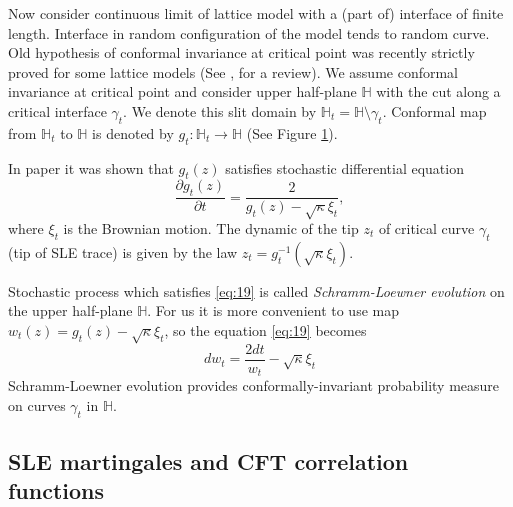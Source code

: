 \documentclass[a4paper]{jpconf}
\theoremstyle{definition}
\theoremstyle{definition} \newtheorem{Def}{Definition}
\begin{document}
Now consider continuous limit of lattice model with a (part of) interface of finite length. Interface in random configuration of the model tends to random curve. Old hypothesis \cite{Polyakov:1970xd} of conformal invariance at critical point was recently strictly proved for some lattice models (See \cite{smirnov2007towards}, \cite{duminil2011conformal} for a review). We assume conformal invariance at critical point and consider upper half-plane $\mathbb{H}$ with the cut along a critical interface $\gamma_{t}$. We denote this slit domain by $\mathbb{H}_{t}=\mathbb{H}\setminus \gamma_{t}$. Conformal map from $\mathbb{H}_{t}$ to $\mathbb{H}$ is denoted by $g_{t}:\mathbb{H}_{t}\to \mathbb{H}$ (See Figure \ref{fig:sle2}).

\begin{figure}[h]
  \label{fig:sle2}
\end{figure}

In paper \cite{schramm2000scaling} it was shown that $g_{t}(z)$ satisfies stochastic differential equation 
\begin{equation}
\label{eq:19}
  \frac{\partial g_t(z)}{\partial t} = \frac{ 2}{g_t(z)-\sqrt{\kappa}\xi_{t}} ,
\end{equation}
where $\xi_{t}$ is the Brownian motion. The dynamic of the tip $z_{t}$ of critical curve $\gamma_{t}$ (tip of SLE trace) is given by the law $z_{t}=g_{t}^{-1}(\sqrt{\kappa}\xi_{t})$. 

Stochastic process which satisfies \eqref{eq:19} is called     {\it Schramm-Loewner evolution} on the upper half-plane $\mathbb{H}$.
For us it is more convenient to use map $w_{t} (z)=g_{t}(z)-\sqrt{\kappa}\xi_{t}$, so the equation \eqref{eq:19} becomes
\begin{equation}
  \label{eq:20}
       d w _{t}= \frac{2dt}{w_{t} }-\sqrt{\kappa}\xi_{t}  
\end{equation}
Schramm-Loewner evolution provides conformally-invariant probability measure on curves $\gamma_{t}$ in $\mathbb{H}$.

\subsection{SLE martingales and CFT correlation functions}
\label{sec:corr-betw-sle}
\end{document}
